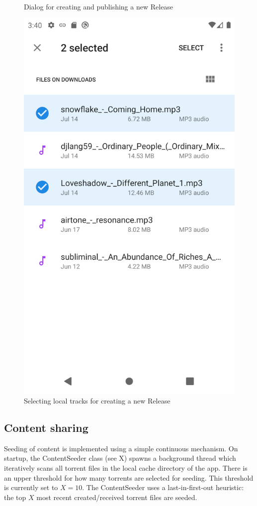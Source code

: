 \begin{figure}
        \caption{Dialog for creating and publishing a new Release}
        \label{fig:submit-release-dialog}
    \endminipage\hfill
        \includegraphics[width=\linewidth]{implementation/screenshot-submit-release.png}
        \caption{Selecting local tracks for creating a new Release}
        \label{fig:select-tracks}
    \endminipage\hfill
    \endminipage
\end{figure}
\subsection{Content sharing}
Seeding of content is implemented using a simple continuous mechanism. On startup, the ContentSeeder class (see X) spawns a background thread which iteratively scans all torrent files in the local cache directory of the app. There is an upper threshold for how many torrents are selected for seeding. This threshold is currently set to \(X=10\). The ContentSeeder uses a last-in-first-out heuristic: the top \(X\) most recent created/received torrent files are seeded.

